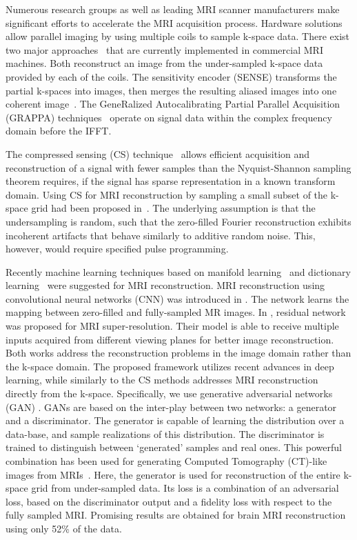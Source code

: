 \documentclass[review]{elsarticle}
\begin{document}
Numerous research groups as well as leading MRI scanner manufacturers
make significant efforts to accelerate the MRI acquisition process.
Hardware solutions allow parallel imaging by using multiple coils
\cite{roemer1990nmr} to sample k-space data. There exist two major
approaches~\cite{Deshmane2012} that are currently implemented in
commercial MRI machines. Both reconstruct an image from the under-sampled
k-space data provided by each of the coils. The sensitivity encoder
(SENSE) transforms the partial k-spaces into images, then merges the
resulting aliased images into one coherent image~\cite{pruessmann1999sense}.
The GeneRalized Autocalibrating Partial Parallel Acquisition (GRAPPA)
techniques~\cite{griswold2002generalized} operate on signal data
within the complex frequency domain before the IFFT.

The compressed sensing (CS) technique~\cite{donoho2006compressed}
allows efficient acquisition and reconstruction of a signal with fewer
samples than the Nyquist-Shannon sampling theorem requires, if the
signal has sparse representation in a known transform domain. Using
CS for MRI reconstruction by sampling a small subset of the k-space
grid had been proposed in~\cite{lustig2007sparse}. The underlying
assumption is that the undersampling is random, such that the zero-filled
Fourier reconstruction exhibits incoherent artifacts that behave similarly
to additive random noise. This, however, would require specified pulse
programming.

Recently machine learning techniques based on manifold learning~\cite{usman2014compressive,bhatia2015fast}
and dictionary learning~\cite{ravishankar2011mr,caballero2014dictionary}
were suggested for MRI reconstruction. MRI reconstruction using convolutional
neural networks (CNN) was introduced in \cite{wang2016accelerating}.
The network learns the mapping between zero-filled and fully-sampled
MR images. In \cite{Oktay2016}, residual network was proposed for
MRI super-resolution. Their model is able to receive multiple inputs
acquired from different viewing planes for better image reconstruction.
Both works address the reconstruction problems in the image domain
rather than the k-space domain. The proposed framework utilizes recent
advances in deep learning, while similarly to the CS methods addresses
MRI reconstruction directly from the k-space. Specifically, we use
generative adversarial networks (GAN) \cite{goodfellow2014generative,radford2015unsupervised,pathak2016context}.
GANs are based on the inter-play between two networks: a generator
and a discriminator. The generator is capable of learning the distribution
over a data-base, and sample realizations of this distribution. The
discriminator is trained to distinguish between `generated' samples
and real ones. This powerful combination has been used for generating
Computed Tomography (CT)-like images from MRIs~\cite{nie2016medical}.
Here, the generator is used for reconstruction of the entire k-space
grid from under-sampled data. Its loss is a combination of an adversarial
loss, based on the discriminator output and a fidelity loss with respect
to the fully sampled MRI. Promising results are obtained for brain
MRI reconstruction using only 52\% of the data.
\end{document}
